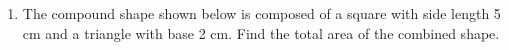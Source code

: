 \documentclass[12pt, twoside]{article}
\begin{document}
\begin{enumerate}
\item The compound shape shown below is composed of a square with side length 5 cm and a triangle with base 2 cm. Find the total area of the combined shape.
    \vspace{1cm} 
    \begin{flushleft}
    \end{flushleft} \vspace{1cm}  

   
\end{enumerate}
\end{document}
